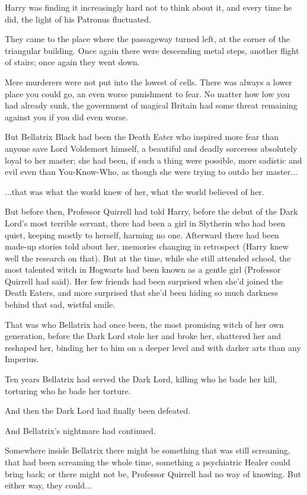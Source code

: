 Harry was finding it increasingly hard not to think about it, and every time he did, the light of his Patronus fluctuated.

They came to the place where the passageway turned left, at the corner of the triangular building. Once again there were descending metal steps, another flight of stairs; once again they went down.

Mere murderers were not put into the lowest of cells. There was always a lower place you could go, an even worse punishment to fear. No matter how low you had already sunk, the government of magical Britain had some threat remaining against you if you did even worse.

But Bellatrix Black had been the Death Eater who inspired more fear than anyone save Lord Voldemort himself, a beautiful and deadly sorceress absolutely loyal to her master; she had been, if such a thing were possible, more sadistic and evil even than You-Know-Who, as though she were trying to outdo her master...

...that was what the world knew of her, what the world believed of her.

But before then, Professor Quirrell had told Harry, before the debut of the Dark Lord's most terrible servant, there had been a girl in Slytherin who had been quiet, keeping mostly to herself, harming no one. Afterward there had been made-up stories told about her, memories changing in retrospect (Harry knew well the research on that). But at the time, while she still attended school, the most talented witch in Hogwarts had been known as a gentle girl (Professor Quirrell had said). Her few friends had been surprised when she'd joined the Death Eaters, and more surprised that she'd been hiding so much darkness behind that sad, wistful smile.

That was who Bellatrix had once been, the most promising witch of her own generation, before the Dark Lord stole her and broke her, shattered her and reshaped her, binding her to him on a deeper level and with darker arts than any Imperius.

Ten years Bellatrix had served the Dark Lord, killing who he bade her kill, torturing who he bade her torture.

And then the Dark Lord had finally been defeated.

And Bellatrix's nightmare had continued.

Somewhere inside Bellatrix there might be something that was still screaming, that had been screaming the whole time, something a psychiatric Healer could bring back; or there might not be, Professor Quirrell had no way of knowing. But either way, they could...

